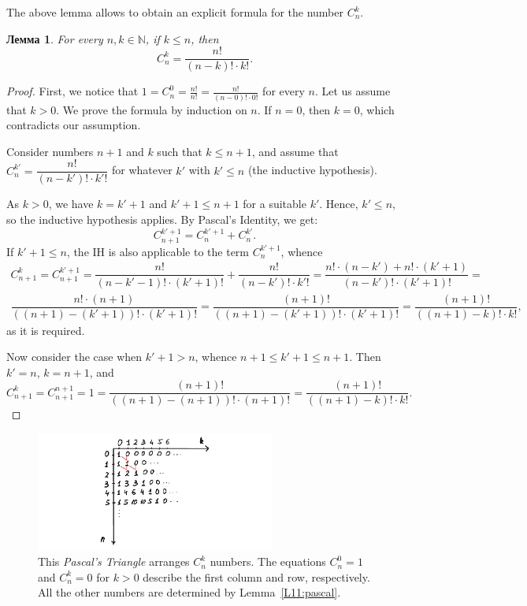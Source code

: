 \documentclass[12pt,notitlepage]{article}
\theoremstyle{plain}
\newtheorem{lemma}[thm]{Лемма}
\theoremstyle{definition}
\theoremstyle{plain}
\newcommand{\N}{\mathbb{N}}
\newcommand{\1}{\mathbf{1}}
\newcommand{\0}{\mathbf{0}}
\begin{document}
\noindent The above lemma allows to obtain an explicit formula for the number $C_n^k$.

\begin{lemma}
	For every $n, k \in \N$, if $k \leq n$, then
	$$C_n^k = \dfrac{n!}{(n-k)! \cdot k!}.$$
\end{lemma}
\begin{proof}
	First, we notice that $1 = C_n^0 = \frac{n!}{n!} = \frac{n!}{(n - 0)! \cdot 0!}$ for every $n$. Let us assume that $k > 0$. We prove the formula by induction on $n$. If $n = 0$, then $k = 0$, which contradicts our assumption.
	
	Consider numbers $n + 1$ and $k$ such that $k \leq n + 1$, and assume that $C_n^{k'} = \dfrac{n!}{(n-k')! \cdot k'!}$ for whatever $k'$ with $k' \leq n$ (the inductive hypothesis).
	
	As $k > 0$, we have $k = k' + 1$ and $k' + 1 \leq n + 1$ for a suitable $k'$. Hence, $k' \leq n$, so the inductive hypothesis applies. By Pascal's Identity, we get:
	$$C_{n + 1}^{k' + 1} = C_n^{k' + 1} + C_n^{k'}.$$
	If $k' + 1 \leq n$, the IH is also applicable to the term $C_n^{k' + 1}$, whence
	\begin{multline*}
		C_{n+1}^k = C_{n + 1}^{k' + 1} = \dfrac{n!}{(n-k'-1)! \cdot (k'+1)!} + \dfrac{n!}{(n-k')! \cdot k'!} =
		\dfrac{n!\cdot (n - k') + n! \cdot (k' + 1)}{(n-k')! \cdot (k'+1)!} =\\
		\dfrac{n!\cdot (n + 1)}{((n+1)-(k'+1))! \cdot (k'+1)!} = \dfrac{(n + 1)!}{((n+1)-(k'+1))! \cdot (k'+1)!} = \dfrac{(n + 1)!}{((n+1)-k)! \cdot k!},
	\end{multline*}
	as it is required.
	
	Now consider the case when $k' + 1 > n$, whence $n + 1 \leq k' + 1 \leq n + 1$. Then $k' = n$, $k = n + 1$, and
	$$C_{n+1}^k =  C_{n+1}^{n+1} = 1 = \dfrac{(n + 1)!}{((n+1)-(n+1))! \cdot (n+1)!} = \dfrac{(n + 1)!}{((n+1)-k)! \cdot k!} .$$
\end{proof}

\begin{figure}[h]
	\centering
	\includegraphics*[width=0.7\textwidth]{pascal_triang.pdf}
	\caption{This \emph{Pascal's Triangle} arranges $C_n^k$ numbers. The equations $C_n^0 = 1$ and $C_n^k = 0$ for $k > 0$ describe the first column and row, respectively. All the other
		numbers are determined by Lemma~\ref{L11:pascal}.}
\end{figure}
\end{document}
